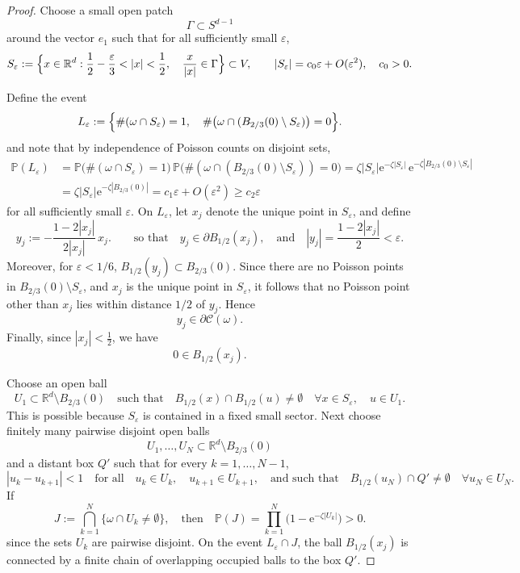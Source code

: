 \documentclass[11pt]{article}
\newcommand{\e}{\mathrm e}
\newcommand{\R}{\mathbb R}
\renewcommand{\P}{\mathbb P}
\theoremstyle{rem}
\begin{document}
\begin{proof}
\medskip

Choose a small open patch
\[
\Gamma\subset S^{d-1}
\]
around the vector $e_1$ such that for all sufficiently small $\varepsilon$,
\begin{equation}\label{Seps}
S_\varepsilon
:=
\Bigl\{
x\in\mathbb R^d:
\frac12-\frac{\varepsilon}{3}<|x|<\frac12,
\quad
\frac{x}{|x|}\in\Gamma
\Bigr\}
\subset V,
\qquad
|S_\varepsilon|
=
c_0\varepsilon+O(\varepsilon^2),
\quad
c_0>0.
\end{equation}

Define the event
\[
L_\varepsilon
:=
\Bigl\{
\#(\omega\cap S_\varepsilon)=1,
\quad
\#\bigl(
\omega\cap(B_{2/3}(0)\setminus S_\varepsilon)
\bigr)=0
\Bigr\}.
\]
and note that by independence of Poisson counts on disjoint sets,
\begin{equation}\label{Leps}
\begin{aligned}
\P(L_\varepsilon)
&=
\P\bigl(
\#(\omega\cap S_\varepsilon)=1
\bigr)
\,
\P\bigl(
\#(
\omega\cap(B_{2/3}(0)\setminus S_\varepsilon)
)=0
\bigr)
=
\zeta |S_\varepsilon|
\e^{-\zeta |S_\varepsilon|}
\,
\e^{-\zeta |B_{2/3}(0)\setminus S_\varepsilon|}
\\
&=
\zeta |S_\varepsilon|
\e^{-\zeta |B_{2/3}(0)|}
=
c_1\varepsilon+O(\varepsilon^2)
\ge
c_2\varepsilon
\end{aligned}
\end{equation}
for all sufficiently small $\varepsilon$. On $L_\varepsilon$, let $x_j$ denote the unique point in $S_\varepsilon$, and define
\[
y_j
:=
-\frac{1-2|x_j|}{2|x_j|}\,x_j.
\qquad\mbox{so that}\quad 
y_j\in \partial B_{1/2}(x_j), \quad\mbox{and}\quad 
|y_j|
=
\frac{1-2|x_j|}{2}
<
\varepsilon.
\]
Moreover, for $\varepsilon<1/6$,
$B_{1/2}(y_j)\subset B_{2/3}(0)$.
Since there are no Poisson points in
$B_{2/3}(0)\setminus S_\varepsilon$,
and $x_j$ is the unique point in $S_\varepsilon$, it follows that no Poisson point other than $x_j$ lies within distance $1/2$ of $y_j$. Hence
$$y_j\in\partial\mathcal C(\omega).
$$
Finally, since $|x_j|<\frac12$,
we have
\[
0\in B_{1/2}(x_j).
\]

\medskip

Choose an open ball
\[
U_1\subset \mathbb R^d\setminus B_{2/3}(0)
\quad\mbox{such that}\quad 
B_{1/2}(x)\cap B_{1/2}(u)\neq\emptyset
\quad
\forall
x\in S_\varepsilon,
\quad
u\in U_1.
\]
This is possible because $S_\varepsilon$ is contained in a fixed small sector.
Next choose finitely many pairwise disjoint open balls
\[
U_1,\dots,U_N
\subset
\R^d\setminus B_{2/3}(0)
\]
and a distant box $Q'$ such that for every $k=1,\dots,N-1$,
\[
|u_k-u_{k+1}|<1
\quad\mbox{for all}\quad 
u_k\in U_k,
\quad
u_{k+1}\in U_{k+1},
\quad\mbox{and such that}\quad 
B_{1/2}(u_N)\cap Q'\neq\emptyset
\quad \forall u_N\in U_N.
\]
If
\begin{equation}\label{J}
J
:=
\bigcap_{k=1}^N
\{\omega\cap U_k\neq\emptyset\}, \quad\mbox{then}\quad \P(J)
=
\prod_{k=1}^N
\bigl(
1-\e^{-\zeta |U_k|}
\bigr)
>0.
\end{equation}
since the sets $U_k$ are pairwise disjoint. On the event $L_\varepsilon\cap J$, the ball
$B_{1/2}(x_j)$ is connected by a finite chain of overlapping occupied balls to the box $Q'$.


\end{proof}
\end{document}

